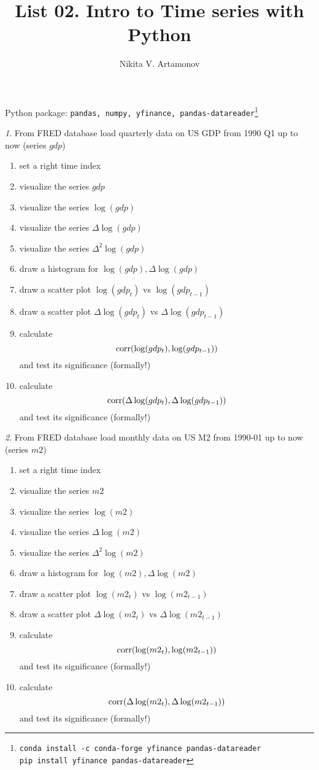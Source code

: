 \documentclass[12pt]{article}
\title{List 02. Intro to Time series with Python}
\author{Nikita V. Artamonov}
\theoremstyle{remark}
\newtheorem{exercise}{}[section]
\begin{document}
\maketitle

Python package: \texttt{pandas, numpy, yfinance, 
pandas-datareader}\footnote{\texttt{conda install -c conda-forge yfinance pandas-datareader}\\
\texttt{pip install yfinance pandas-datareader}}


\begin{exercise}
From FRED database load quarterly data on US GDP from 1990 Q1 up to now (series \(gdp\))
\begin{enumerate}
	\item set a right time index
	\item visualize the series \(gdp\)
	\item visualize the series \(\log(gdp)\)
	\item visualize the series \(\Delta\log(gdp)\)
	\item visualize the series \(\Delta^2\log(gdp)\)
	\item draw a histogram for \(\log(gdp),\Delta\log(gdp)\)
	\item draw a scatter plot \(\log(gdp_t)\) vs \(\log(gdp_{t-1})\)
	\item draw a scatter plot \(\Delta\log(gdp_t)\) vs \(\Delta\log(gdp_{t-1})\)
	\item calculate \[\operatorname{corr}(\log(gdp_t), \log(gdp_{t-1}))\] and test its significance (formally!)
	\item calculate \[\operatorname{corr}(\Delta\log(gdp_t), \Delta\log(gdp_{t-1}))\] 
	and test its significance (formally!) 
\end{enumerate}
\end{exercise}
	
\begin{exercise}
From FRED database load monthly data on US M2 from 1990-01 up to now (series \(m2\)) 
\begin{enumerate}
	\item set a right time index
	\item visualize the series \(m2\)
	\item visualize the series \(\log(m2)\)
	\item visualize the series \(\Delta\log(m2)\)
	\item visualize the series \(\Delta^2\log(m2)\)
	\item draw a histogram for \(\log(m2),\Delta\log(m2)\)
	\item draw a scatter plot \(\log(m2_t)\) vs \(\log(m2_{t-1})\)
	\item draw a scatter plot \(\Delta\log(m2_t)\) vs \(\Delta\log(m2_{t-1})\)
	\item calculate \[\operatorname{corr}(\log(m2_t), \log(m2_{t-1}))\] and test its significance (formally!)
	\item calculate \[\operatorname{corr}(\Delta\log(m2_t), \Delta\log(m2_{t-1}))\] and test its significance (formally!)
\end{enumerate}
\end{exercise}
\end{document}
